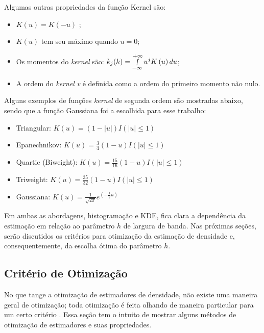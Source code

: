 Algumas outras propriedades da função Kernel são:

\begin{itemize}
  \item $K\left( u \right) = K\left( { - u} \right)$ ;
  \item $K\left( u \right)$ tem seu máximo quando $u=0$;
  \item Os momentos do \emph{kernel} são: ${k_j}(k) = \mathop \smallint \limits_{ - \infty }^{ + \infty } {u^j}K\left( u \right)du$;
  \item A ordem do \emph{kernel} \emph{v} é definida como a ordem do primeiro momento não nulo.
\end{itemize}

Alguns exemplos de funções \emph{kernel} de segunda ordem são mostradas abaixo, sendo que a função Gaussiana foi a escolhida para esse trabalho:

\begin{itemize}
  \item Triangular:  $K\left( u \right) = (1 - |u|)I(|u| \le 1)$
  \item Epanechnikov: $K\left( u \right) = \frac{3}{4}(1 - u)I(|u| \le 1)$
  \item Quartic (Biweight): $K\left( u \right) = \frac{{15}}{{16}}(1 - u)I(|u| \le 1)$
  \item Triweight: $K\left( u \right) = \frac{{35}}{{32}}(1 - u)I(|u| \le 1)$
  \item Gaussiana: $K\left( u \right) = \frac{1}{{\sqrt {2\pi } }}{e^{\left( { - \frac{1}{2}u} \right)}}$
\end{itemize}


Em ambas as abordagens, histogramação e KDE, fica clara a dependência da estimação em relação ao parâmetro $h$ de largura de banda. Nas próximas seções, serão discutidos os critérios para otimização da estimação de densidade e, consequentemente, da escolha ótima do parâmetro $h$.

\subsection{Critério de Otimização}

No que tange a otimização de estimadores de densidade, não existe uma maneira geral de otimização; toda otimização é feita olhando de maneira particular para um certo critério \cite{kernelthesis}. Essa seção tem o intuito de mostrar alguns métodos de otimização de estimadores e suas propriedades.


